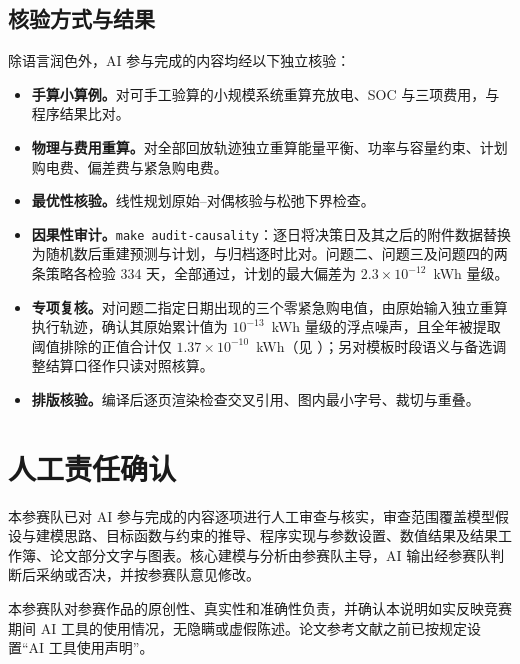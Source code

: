 \documentclass[UTF8,zihao=-4]{ctexart}
\begin{document}
\subsection*{核验方式与结果}

除语言润色外，AI 参与完成的内容均经以下独立核验：

\begin{itemize}
\item \textbf{手算小算例。}对可手工验算的小规模系统重算充放电、SOC 与三项费用，与程序结果比对。
\item \textbf{物理与费用重算。}对全部回放轨迹独立重算能量平衡、功率与容量约束、计划购电费、偏差费与紧急购电费。
\item \textbf{最优性核验。}线性规划原始--对偶核验与松弛下界检查。
\item \textbf{因果性审计。}\texttt{make audit-causality}：逐日将决策日及其之后的附件数据替换为随机数后重建预测与计划，与归档逐时比对。问题二、问题三及问题四的两条策略各检验 334 天，全部通过，计划的最大偏差为 $2.3\times10^{-12}$~kWh 量级。
\item \textbf{专项复核。}对问题二指定日期出现的三个零紧急购电值，由原始输入独立重算执行轨迹，确认其原始累计值为 $10^{-13}$~kWh 量级的浮点噪声，且全年被提取阈值排除的正值合计仅 $1.37\times10^{-10}$~kWh（见 ）；另对模板时段语义与备选调整结算口径作只读对照核算。
\item \textbf{排版核验。}编译后逐页渲染检查交叉引用、图内最小字号、裁切与重叠。
\end{itemize}


\section{人工责任确认}

本参赛队已对 AI 参与完成的内容逐项进行人工审查与核实，审查范围覆盖模型假设与建模思路、目标函数与约束的推导、程序实现与参数设置、数值结果及结果工作簿、论文部分文字与图表。核心建模与分析由参赛队主导，AI 输出经参赛队判断后采纳或否决，并按参赛队意见修改。

本参赛队对参赛作品的原创性、真实性和准确性负责，并确认本说明如实反映竞赛期间 AI 工具的使用情况，无隐瞒或虚假陈述。论文参考文献之前已按规定设置“AI 工具使用声明”。
\end{document}
